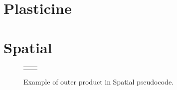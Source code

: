 \section{Plasticine}

\section{Spatial}

\begin{figure}
\centering
\newsavebox{\outerProduct}
\begin{lrbox}{\outerProduct}

\end{lrbox}
\begin{tabular}{m{0.01cm} l} & \usebox{\outerProduct}\\ \end{tabular}
  \caption{Example of outer product in Spatial pseudocode.}
\label{fig:spatial_app}
\end{figure}

